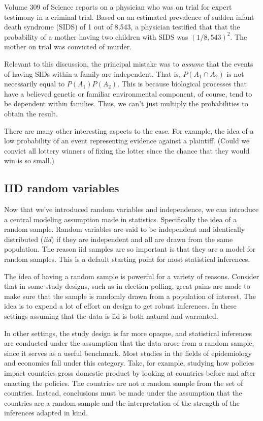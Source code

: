 \documentclass[]{article}
\begin{document}
Volume 309 of Science reports on a physician who was on trial for expert
testimony in a criminal trial. Based on an estimated prevalence of
sudden infant death syndrome (SIDS) of 1 out of 8,543, a physician
testified that that the probability of a mother having two children with
SIDS was $(1 / 8,543)^2$. The mother on trial was convicted of murder.

Relevant to this discussion, the principal mistake was to \emph{assume}
that the events of having SIDs within a family are independent. That is,
$P(A_1 \cap A_2)$ is not necessarily equal to $P(A_1)P(A_2)$. This is
because biological processes that have a believed genetic or familiar
environmental component, of course, tend to be dependent within
families. Thus, we can't just multiply the probabilities to obtain the
result.

There are many other interesting aspects to the case. For example, the
idea of a low probability of an event representing evidence against a
plaintiff. (Could we convict all lottery winners of fixing the lotter
since the chance that they would win is so small.)

\subsection{IID random variables}\label{iid-random-variables}

Now that we've introduced random variables and independence, we can
introduce a central modeling assumption made in statistics. Specifically
the idea of a random sample. Random variables are said to be independent
and identically distributed (\emph{iid}) if they are independent and all
are drawn from the same population. The reason iid samples are so
important is that they are a model for random samples. This is a default
starting point for most statistical inferences.

The idea of having a random sample is powerful for a variety of reasons.
Consider that in some study designs, such as in election polling, great
pains are made to make sure that the sample is randomly drawn from a
population of interest. The idea is to expend a lot of effort on design
to get robust inferences. In these settings assuming that the data is
iid is both natural and warranted.

In other settings, the study design is far more opaque, and statistical
inferences are conducted under the assumption that the data arose from a
random sample, since it serves as a useful benchmark. Most studies in
the fields of epidemiology and economics fall under this category. Take,
for example, studying how policies impact countries gross domestic
product by looking at countries before and after enacting the policies.
The countries are not a random sample from the set of countries.
Instead, conclusions must be made under the assumption that the
countries are a random sample and the interpretation of the strength of
the inferences adapted in kind.
\end{document}
